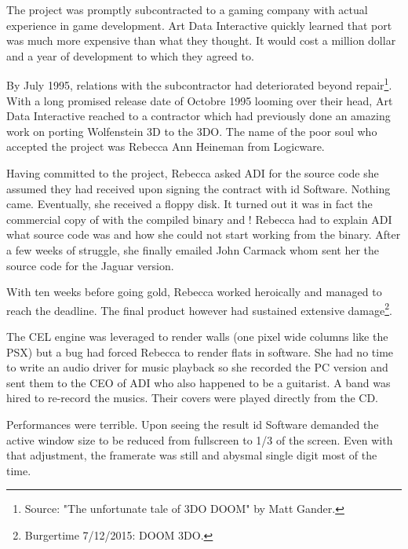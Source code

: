 The project was promptly subcontracted to a gaming company with actual experience in game development. Art Data Interactive quickly learned that port was much more expensive than what they thought. It would cost a million dollar and a year of development to which they agreed to.\\
\par
By July 1995, relations with the subcontractor had deteriorated beyond repair\footnote{Source: "The unfortunate tale of 3DO DOOM" by Matt Gander.}. With a long promised release date of Octobre 1995 looming over their head, Art Data Interactive reached to a contractor which had previously done an amazing work on porting Wolfenstein 3D to the 3DO. The name of the poor soul who accepted the project was Rebecca Ann Heineman from Logicware.\\
\par
Having committed to the project, Rebecca asked ADI for the source code she assumed they had received upon signing the contract with id Software. Nothing came. Eventually, she received a floppy disk. It turned out it was in fact the commercial copy of \doom with the compiled binary  and ! Rebecca had to explain ADI what source code was and how she could not start working from the binary. After a few weeks of struggle, she finally emailed John Carmack whom sent her the source code for the Jaguar version.\\
\par
 With ten weeks before going gold, Rebecca worked heroically and managed to reach the deadline. The final product however had sustained extensive damage\footnote{Burgertime 7/12/2015: DOOM 3DO.}.\\
\par
{}
\par
The CEL engine was leveraged to render walls (one pixel wide columns like the PSX) but a bug had forced Rebecca to render flats in software. She had no time to write an audio driver for music playback so she recorded the PC version and sent them to the CEO of ADI who also happened to be a guitarist. A band was hired to re-record the musics. Their covers were played directly from the CD.\\ 
\par
 Performances were terrible. Upon seeing the result id Software demanded the active window size to be reduced from fullscreen to 1/3 of the screen. Even with that adjustment, the framerate was still and abysmal single digit most of the time.\\
